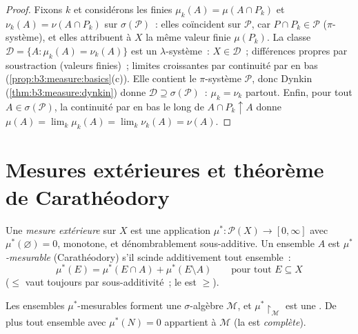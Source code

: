 \begin{proof}
Fixons $k$ et considérons les  finies $\mu_k(A) =
\mu(A \cap P_k)$ et $\nu_k(A) = \nu(A \cap P_k)$ sur
$\sigma(\mathcal P)$~: elles coïncident sur $\mathcal P$, car
$P \cap P_k \in \mathcal P$ ($\pi$-système), et elles
attribuent à $X$ la même valeur finie $\mu(P_k)$. La classe
$\mathcal D = \{A : \mu_k(A) = \nu_k(A)\}$ est un
$\lambda$-système~: $X \in \mathcal D$~; différences propres
par soustraction (valeurs finies)~; limites croissantes par
continuité par en bas (\cref{prop:b3:measure:basics}(c)). Elle
contient le $\pi$-système $\mathcal P$, donc Dynkin
(\cref{thm:b3:measure:dynkin}) donne $\mathcal D \supseteq
\sigma(\mathcal P)$~: $\mu_k = \nu_k$ partout. Enfin, pour
tout $A \in \sigma(\mathcal P)$, la continuité par en bas le
long de $A \cap P_k \uparrow A$ donne $\mu(A) =
\lim_k\mu_k(A) = \lim_k\nu_k(A) = \nu(A)$.
\end{proof}

\section{Mesures extérieures et théorème de Carathéodory}

\begin{definition}\label{def:b3:measure:outer}
Une \emph{mesure extérieure} sur $X$
est une application $\mu^* \colon \mathcal P(X) \to [0,
\infty]$ avec $\mu^*(\varnothing) = 0$, monotone, et
dénombrablement sous-additive. Un ensemble $A$ est
\emph{$\mu^*$-mesurable} (Carathéodory) s'il scinde
additivement tout ensemble~:
\[
\mu^*(E) = \mu^*(E \cap A) + \mu^*(E \setminus A)
\qquad \text{pour tout } E \subseteq X
\]
($\leq$ vaut toujours par sous-additivité~; le  est
$\geq$).
\end{definition}

\begin{theorem}[Carathéodory]\label{thm:b3:measure:caratheodory}
Les ensembles $\mu^*$-mesurables forment une $\sigma$-algèbre
$\mathcal M$, et $\mu^*\restriction_{\mathcal M}$ est une
. De plus tout ensemble avec $\mu^*(N) = 0$ appartient
à $\mathcal M$ (la  est
\emph{complète}).
\end{theorem}


